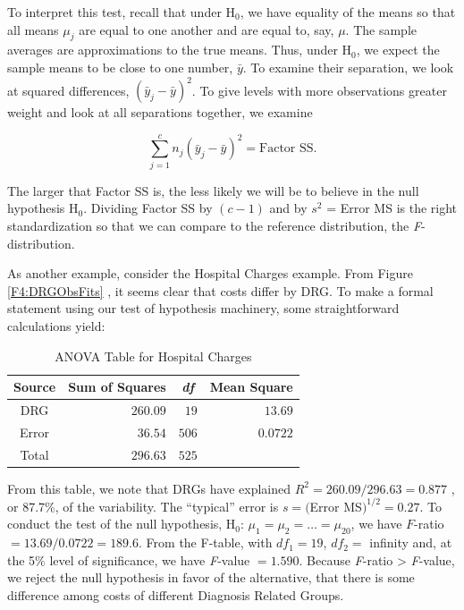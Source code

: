 To interpret this test, recall that under H$_0$, we have equality of
the means so that all means $\mu_{j}$ are equal to one another and
are equal to, say, $\mu $. The sample averages are approximations to
the true means.
Thus, under H$_0$, we expect the sample means to be close to one number, $%
\bar{y}$. To examine their separation, we look at squared differences, $(%
\bar{y}_{j}-\bar{y})^{2}$. To give levels with more observations greater
weight and look at all separations together, we examine

\begin{equation*}
\sum_{j=1}^{c}n_{j}(\bar{y}_{j}-\bar{y})^{2}=\text{Factor SS}.
\end{equation*}

The larger that Factor SS is, the less likely we will be to believe
in the null hypothesis H$_0$. Dividing Factor SS by $(c-1)$ and by
$s^{2}$ = Error MS is the right standardization so that we can
compare to the reference distribution, the \textit{F}-distribution.


As another example, consider the Hospital Charges example. From
Figure \ref{F4:DRGObsFits} , it seems clear that costs differ by
DRG. To make a formal statement using our test of hypothesis
machinery, some straightforward calculations yield:

  \begin{center}  \begin{table}[h]
\caption{\label{T4:HospChgANOVA} ANOVA Table for Hospital Charges}
\begin{tabular}{cccc}
\hline
Source & Sum of Squares & \textit{df} & Mean Square \\ \hline
DRG & \multicolumn{1}{r}{$260.09$} & \multicolumn{1}{r}{$19$} &
\multicolumn{1}{r}{$13.69$} \\
Error & \multicolumn{1}{r}{$36.54$} & \multicolumn{1}{r}{$506$} &
\multicolumn{1}{r}{$0.0722$} \\
Total & \multicolumn{1}{r}{$296.63$} & \multicolumn{1}{r}{$525$} &
\multicolumn{1}{r}{} \\ \hline
\end{tabular}

\end{table}  \end{center}  

\noindent From this table, we note that DRGs have explained $R^{2}=260.09/296.63=0.877$%
, or 87.7\%, of the variability. The ``typical'' error is $s=($Error MS$%
)^{1/2}=0.27$. To conduct the test of the null hypothesis, H$_0$:
$\mu _1=\mu_2=\ldots =\mu_{20}$, we have $F$-ratio
$=13.69/0.0722=189.6$. From the F-table, with $df_1=19$, $df_2=$
infinity and, at the 5\% level of significance, we have
\textit{F}-value $=1.590$. Because \textit{F}-ratio
> \textit{F}-value, we reject the null hypothesis in favor of
the alternative, that there is some difference among costs of different
Diagnosis Related Groups.

